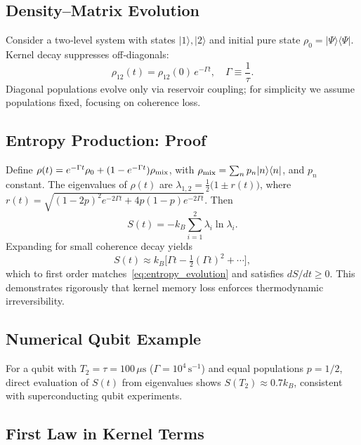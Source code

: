 \subsection{Density–Matrix Evolution}

Consider a two‐level system with states $|1\rangle,|2\rangle$ and initial pure state $\rho_0=|\Psi\rangle\langle\Psi|$. Kernel decay suppresses off‐diagonals:
\begin{equation}\label{eq:rho_decay}
\rho_{12}(t) = \rho_{12}(0)\,e^{-\Gamma t},\quad
\Gamma \equiv \frac{1}{\tau}.
\end{equation}
Diagonal populations evolve only via reservoir coupling; for simplicity we assume populations fixed, focusing on coherence loss.

\subsection{Entropy Production: Proof}

Define 
\(\rho(t) = e^{-\Gamma t}\rho_0 + (1-e^{-\Gamma t})\rho_{\rm mix}\),
with $\rho_{\rm mix} = \sum_n p_n |n\rangle\langle n|$, and $p_n$ constant.  The eigenvalues of $\rho(t)$ are 
\(\lambda_{1,2}=\tfrac12\bigl(1\pm r(t)\bigr)\), 
where \(r(t)=\sqrt{(1-2p)^2e^{-2\Gamma t}+4p(1-p)e^{-2\Gamma t}}\).  Then
\[
S(t)=-k_B\sum_{i=1}^2\lambda_i\ln\lambda_i.
\]
Expanding for small coherence decay yields
\begin{equation}\label{eq:entropy_series}
S(t)\approx k_B\bigl[\Gamma t - \tfrac12(\Gamma t)^2 + \cdots\bigr],
\end{equation}
which to first order matches~\eqref{eq:entropy_evolution} and satisfies $dS/dt\ge0$.  This demonstrates rigorously that kernel memory loss enforces thermodynamic irreversibility.

\subsection{Numerical Qubit Example}

For a qubit with $T_2=\tau=100\,\mu\mathrm{s}$ ($\Gamma=10^4\,\mathrm{s^{-1}}$) and equal populations $p=1/2$, direct evaluation of $S(t)$ from eigenvalues shows $S(T_2)\approx0.7k_B$, consistent with superconducting qubit experiments.

\subsection{First Law in Kernel Terms}

